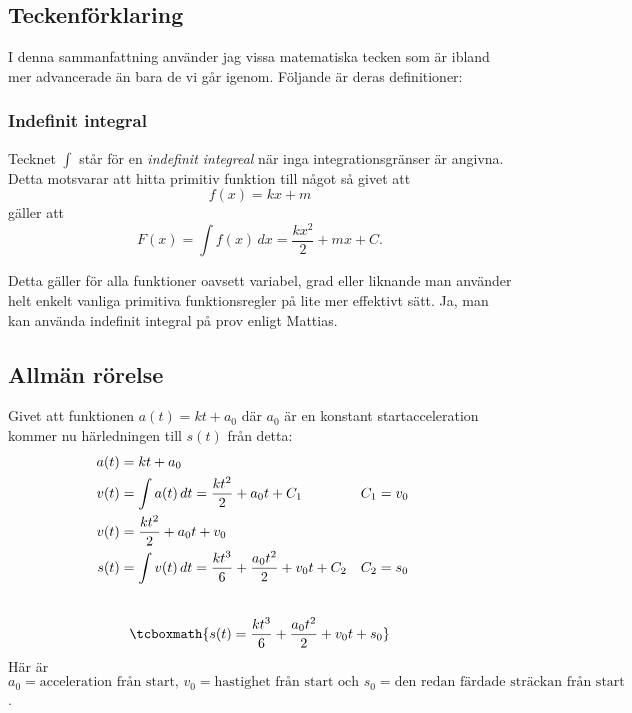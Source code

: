 \subsection{Teckenförklaring}
I denna sammanfattning använder jag vissa matematiska tecken som är ibland mer advancerade än bara de vi går igenom. Följande är deras definitioner:

\subsubsection*{Indefinit integral}
\label{def:indefint}
Tecknet $\int$ står för en \emph{indefinit integreal} när inga integrationsgränser är angivna. Detta motsvarar att hitta primitiv funktion till något så givet att \[f(x) = kx + m\] gäller att
\begin{equation*}
    F(x) = \int{f(x)}\, dx = \frac{kx^2}{2} + mx + C.
\end{equation*}

Detta gäller för alla funktioner oavsett variabel, grad eller liknande man använder helt enkelt vanliga primitiva funktionsregler på lite mer effektivt sätt. Ja, man kan använda indefinit integral på prov enligt Mattias.

\subsection{Allmän rörelse}
\label{derive:allmänrörelse}
Givet att funktionen $a(t) = kt + a_0$ där $a_0$ är en konstant startacceleration kommer nu härledningen till $s(t)$ från detta:
\begin{gather*}
    \begin{aligned}
        \centering
        a(t) &= kt + a_0 \\
        v(t) &= \int{a(t)}\, dt = \frac{kt^2}{2} + a_0t + C_1 & C_1 &= v_0 \\
        v(t) &= \frac{kt^2}{2} + a_0t + v_0 \\
        s(t) &= \int{v(t)}\, dt = \frac{kt^3}{6} + \frac{a_0t^2}{2} + v_0t + C_2 & C_2 &= s_0 \\[10pt]
    \end{aligned} \\[10pt]
    \tcboxmath{s(t) = \frac{kt^3}{6} + \frac{a_0t^2}{2} + v_0t + s_0}
\end{gather*}
\noindent Här är \(a_0 = \text{acceleration från start, } v_0 = \text{hastighet från start och } s_0 = \text{den redan färdade sträckan från start}\).
